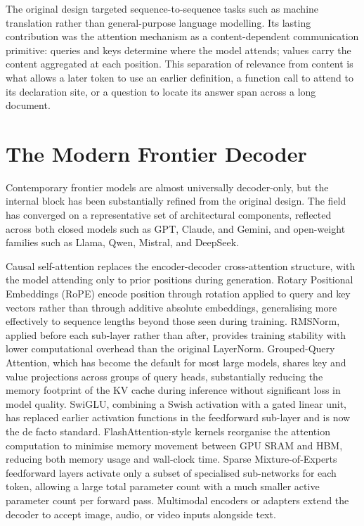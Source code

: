 The original design targeted sequence-to-sequence tasks such as machine translation
rather than general-purpose language modelling. Its lasting contribution was the
attention mechanism as a content-dependent communication primitive: queries and keys
determine where the model attends; values carry the content aggregated at each position.
This separation of relevance from content is what allows a later token to use an earlier
definition, a function call to attend to its declaration site, or a question to locate
its answer span across a long document.

\section{The Modern Frontier Decoder}

Contemporary frontier models are almost universally decoder-only, but the internal block
has been substantially refined from the original design. The field has converged on a
representative set of architectural components, reflected across both closed models such
as GPT, Claude, and Gemini, and open-weight families such as Llama, Qwen, Mistral, and
DeepSeek.

Causal self-attention replaces the encoder-decoder cross-attention structure, with the
model attending only to prior positions during generation. Rotary Positional Embeddings
(RoPE) encode position through rotation applied to query and key vectors rather than
through additive absolute embeddings, generalising more effectively to sequence lengths
beyond those seen during training. RMSNorm, applied before each sub-layer rather than
after, provides training stability with lower computational overhead than the original
LayerNorm. Grouped-Query Attention, which has become the default for most large models,
shares key and value projections across groups of query heads, substantially reducing the
memory footprint of the KV cache during inference without significant loss in model
quality. SwiGLU, combining a Swish activation with a gated linear unit, has replaced
earlier activation functions in the feedforward sub-layer and is now the de facto
standard. FlashAttention-style kernels reorganise the attention computation to minimise
memory movement between GPU SRAM and HBM, reducing both memory usage and wall-clock
time. Sparse Mixture-of-Experts feedforward layers activate only a subset of specialised
sub-networks for each token, allowing a large total parameter count with a much smaller
active parameter count per forward pass. Multimodal encoders or adapters extend the
decoder to accept image, audio, or video inputs alongside text.

